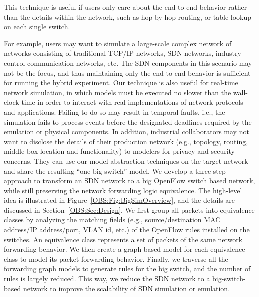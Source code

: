 This technique is useful if users only care about the end-to-end behavior rather than
the details within the network, such as hop-by-hop routing, or table lookup on each single switch.

For example, users may want to simulate a large-scale complex network of networks consisting of traditional TCP/IP networks,
SDN networks, industry control communication networks, etc.
The SDN components in this scenario may not be the focus, and thus maintaining only the end-to-end behavior is sufficient for running the hybrid experiment.
Our technique is also useful for real-time network simulation, in which models must be executed
no slower than the wall-clock time in order to interact with real implementations of network protocols and applications.
Failing to do so may result in temporal faults, i.e., the simulation fails to process events before the designated deadlines
required by the emulation or physical components. 
In addition, industrial collaborators may not want to disclose the details of their production network
(e.g., topology, routing, middle-box location and functionality) to modelers for privacy and security concerns.
They can use our model abstraction techniques on the target network and share the resulting ``one-big-switch'' model.
We develop a three-step approach to transform an SDN network to a big OpenFlow switch based network,
while still preserving the network forwarding logic equivalence.
The high-level idea is illustrated in Figure~\ref{OBS:Fig:BigSimOverview},
and the details are discussed in Section~\ref{OBS:Sec:Design}.
We first group all packets into equivalence classes by analyzing the matching fields
(e.g., source/destination MAC address/IP address/port, VLAN id, etc.)
of the OpenFlow rules installed on the switches.
An equivalence class represents a set of packets of the same network forwarding behavior.
We then create a graph-based model for each equivalence class to model its packet forwarding behavior.
Finally, we traverse all the forwarding graph models to generate rules for the big switch,
and the number of rules is largely reduced.
This way, we reduce the SDN network to a big-switch-based network to
improve the scalability of SDN simulation or emulation.

